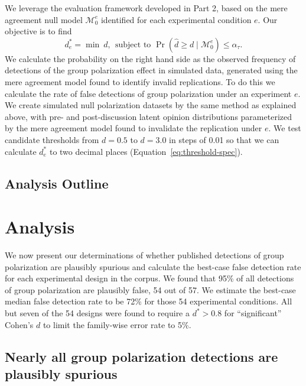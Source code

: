 \documentclass[preview]{article}
\newcommand{\nullmodel}{\mathcal{M}_0}
\begin{document}
We leverage the evaluation framework developed in Part 2, based on the
mere agreement null model $\nullmodel^e$ identified for each experimental
condition $e$. Our objective is to find 
\begin{equation}
  d^*_e = \min~d,~~\text{subject to }
    \Pr\!\left( \hat{d} \ge d \mid \nullmodel^e \right)  \le \alpha_\tau.
  \label{eq:threshold-spec}
\end{equation}
\noindent
We calculate the probability on the right hand side as the observed frequency of
detections of the group polarization effect in simulated data, generated 
using the mere agreement model found to identify invalid replications.
To do this we calculate the rate of false detections of group polarization under an
experiment $e$. We create simulated null polarization
datasets by the same method as explained above, 
with pre- and post-discussion latent opinion distributions
parameterized by the mere agreement model found to invalidate the replication under $e$. 
We test candidate thresholds from $d=0.5$ to $d=3.0$ in steps of 0.01 so that
we can calculate $d^*_e$ to two decimal places (Equation~\ref{eq:threshold-spec}).


\subsection{Analysis Outline}





\section{Analysis}\label{analysis}

We now present our determinations of whether published detections of group
polarization are plausibly spurious and calculate the best-case false detection
rate for each experimental design in the corpus. We found that 95\% of all
detections of group polarization are plausibly false, 54 out of 57. We estimate the
best-case median false detection rate to be 72\% for those 54 experimental
conditions. All but seven of the 54 designs were found to require a $d^* > 0.8$
for ``significant'' Cohen's $d$ to limit the family-wise error rate to 5\%.


\subsection{Nearly all group polarization detections are plausibly spurious}
\end{document}
